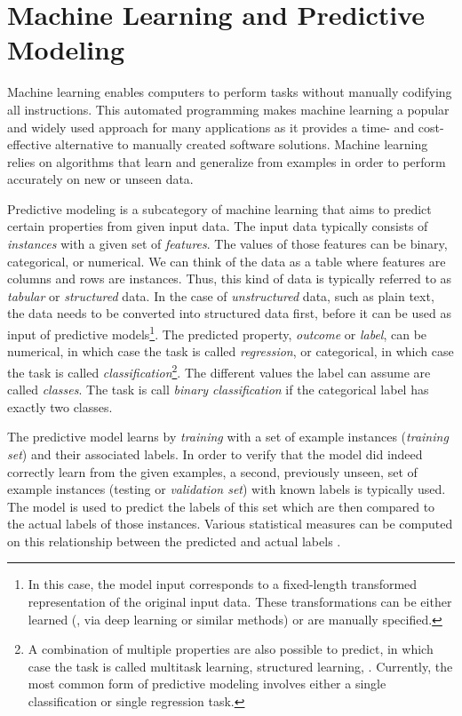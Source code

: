 \section{Machine Learning and Predictive Modeling}
Machine learning enables computers to perform tasks without manually codifying all instructions.
This automated programming makes machine learning a popular and widely used approach for many applications as it provides a time- and cost-effective alternative to manually created software solutions.
Machine learning relies on algorithms that learn and generalize from examples in order to perform accurately on new or unseen data.

Predictive modeling is a subcategory of machine learning that aims to predict certain properties from given input data.
The input data typically consists of \emph{instances} with a given set of \emph{features}.
The values of those features can be binary, categorical, or numerical.
We can think of the data as a table where features are columns and rows are instances.
Thus, this kind of data is typically referred to as \emph{tabular} or \emph{structured} data.
In the case of \emph{unstructured} data, such as plain text, the data needs to be converted into structured data first, before it can be used as input of predictive models\footnote{In this case, the model input corresponds to a fixed-length transformed representation of the original input data. These transformations can be either learned (\ie, via deep learning or similar methods) or are manually specified.}.
The predicted property, \emph{outcome} or \emph{label}, can be numerical, in which case the task is called \emph{regression}, or categorical, in which case the task is called \emph{classification}\footnote{A combination of multiple properties are also possible to predict, in which case the task is called multitask learning, structured learning, \etc. Currently, the most common form of predictive modeling involves either a single classification or single regression task.}.
The different values the label can assume are called \emph{classes}.
The task is call \emph{binary classification} if the categorical label has exactly two classes.

The predictive model learns by \emph{training} with a set of example instances (\emph{training set}) and their associated labels.
In order to verify that the model did indeed correctly learn from the given examples, a second, previously unseen, set of example instances (testing or \emph{validation set}) with known labels is typically used.
The model is used to predict the labels of this set which are then compared to the actual labels of those instances.
Various statistical measures can be computed on this relationship between the predicted and actual labels \cite{mlbook}.

